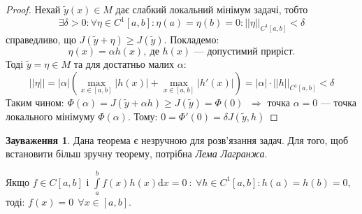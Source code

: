 \documentclass[14pt,a4paper]{scrartcl}
\theoremstyle{definition}
\newtheorem*{remark}{Зауваження}
\theoremstyle{definition}
\theoremstyle{definition}
\begin{document}
\begin{proof}
  Нехай $\tilde{y}(x) \in M$ дає слабкий локальний мінімум задачі, тобто $$\exists \delta > 0 : \forall \eta \in C^1[a, b] : \eta(a) = \eta(b) = 0 : ||\eta||_{C^1[a,b]} < \delta$$ справедливо, що $J(\tilde{y} + \eta) \geq J(\tilde{y})$. Покладемо: $$\eta(x) = \alpha h(x), \ \text{де } h(x) \text{ --- допустимий приріст.}$$
  Тоді $\tilde{y} = \eta \in M$ та для достатньо малих $\alpha$:
  $$
  ||\eta|| = |\alpha| \left( \max\limits_{x\in [a,b]} \left| h(x) \right| + \max\limits_{x\in [a,b]} \left| h'(x) \right| \right) = |\alpha| \cdot ||h||_{C^1[a,b]} < \delta
  $$
  Таким чином:
  $
  \Phi(\alpha) = J( \tilde{y} + \alpha h) \geq J  (\tilde{y}) = \Phi(0) \
  $
  $\Longrightarrow$ точка $\alpha = 0 $ --- точка локального мінімуму $\Phi (\alpha). $ Тому:
  $
  0 = \Phi'(0) = \delta J(\tilde{y}, h)
  $
\end{proof}

\begin{remark}
  Дана теорема є незручною для розв'язання задач. Для того, щоб встановити більш зручну теорему, потрібна \textit{Лема Лагранжа}.
\end{remark}

\begin{boxlema}
  Якщо $f\in C[a,b]$ і $ \int\limits_{a}^{ b}{f(x)h(x) \mathrm{d}x} =0\ :\
  \forall h \in C^1[a, b] : h(a) = h(b) = 0
  $, тоді: $f(x) = 0 \ \ \forall x \in [a,b]$.
\end{boxlema}
\end{document}
